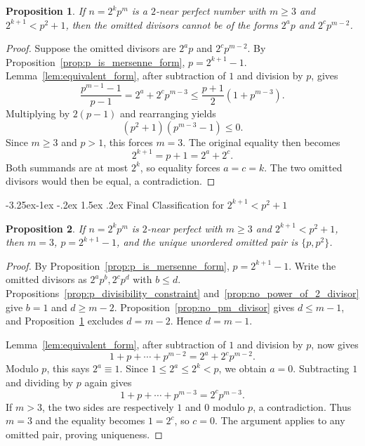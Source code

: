 \documentclass[10pt]{article}
\makeatletter
\renewcommand\subsection{\@startsection{subsection}{2}{\z@}
{-3.25ex\@plus -1ex \@minus -.2ex}
{1.5ex \@plus .2ex}
{\normalfont\normalsize\bfseries\boldmath}}
\newtheorem{proposition}{Proposition}
\theoremstyle{definition}
\makeatother
\begin{document}
\begin{proposition}\label{prop:no_p_and_pm2_divisors}
    If $n=2^kp^m$ is a $2$-near perfect number with $m \ge 3$ and $2^{k+1} < p^2+1$, then the omitted divisors cannot be of the forms $2^ap$ and $2^cp^{m-2}$.
\end{proposition}

\begin{proof}
Suppose the omitted divisors are $2^ap$ and $2^cp^{m-2}$.
By Proposition~\ref{prop:p_is_mersenne_form}, $p=2^{k+1}-1$.
Lemma~\ref{lem:equivalent_form}, after subtraction of $1$ and division
by $p$, gives
\[
\frac{p^{m-1}-1}{p-1}
=2^a+2^cp^{m-3}
\le\frac{p+1}{2}(1+p^{m-3}).
\]
Multiplying by $2(p-1)$ and rearranging yields
\[
(p^2+1)(p^{m-3}-1)\le0.
\]
Since $m\ge3$ and $p>1$, this forces $m=3$.
The original equality then becomes
\[
2^{k+1}=p+1=2^a+2^c.
\]
Both summands are at most $2^k$, so equality forces $a=c=k$.
The two omitted divisors would then be equal, a contradiction.
\end{proof}

\subsection{Final Classification for $2^{k+1} < p^2 + 1$}
\label{sec:final-characterization}

\begin{proposition}\label{prop:case2_classification}
If $n=2^kp^m$ is $2$-near perfect with $m\ge3$ and
$2^{k+1}<p^2+1$, then $m=3$, $p=2^{k+1}-1$, and the unique
unordered omitted pair is $\{p,p^2\}$.
\end{proposition}
\begin{proof}
By Proposition~\ref{prop:p_is_mersenne_form}, $p=2^{k+1}-1$.
Write the omitted divisors as $2^ap^b,2^cp^d$ with $b\le d$.
Propositions~\ref{prop:p_divisibility_constraint}
and~\ref{prop:no_power_of_2_divisor} give $b=1$ and $d\ge m-2$.
Proposition~\ref{prop:no_pm_divisor} gives $d\le m-1$, and
Proposition~\ref{prop:no_p_and_pm2_divisors} excludes $d=m-2$.
Hence $d=m-1$.

Lemma~\ref{lem:equivalent_form}, after subtraction of $1$ and
division by $p$, now gives
\[
1+p+\cdots+p^{m-2}=2^a+2^cp^{m-2}.
\]
Modulo $p$, this says $2^a\equiv1$. Since
$1\le2^a\le2^k<p$, we obtain $a=0$.
Subtracting $1$ and dividing by $p$ again gives
\[
1+p+\cdots+p^{m-3}=2^cp^{m-3}.
\]
If $m>3$, the two sides are respectively $1$ and $0$ modulo $p$,
a contradiction. Thus $m=3$ and the equality becomes $1=2^c$,
so $c=0$. The argument applies to any omitted pair, proving uniqueness.
\end{proof}
\end{document}
